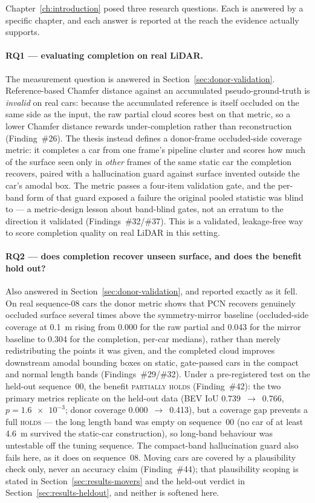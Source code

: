 Chapter~\ref{ch:introduction} posed three research questions. Each is answered by a specific chapter, and each
answer is reported at the reach the evidence actually supports.

\paragraph{RQ1 --- evaluating completion on real LiDAR.}
The measurement question is answered in Section~\ref{sec:donor-validation}. Reference-based Chamfer distance against
an accumulated pseudo-ground-truth is \emph{invalid} on real cars: because the accumulated
reference is itself occluded on the same side as the input, the raw partial cloud scores
best on that metric, so a lower Chamfer distance rewards under-completion rather than
reconstruction (Finding~\#26). The thesis instead defines a donor-frame occluded-side
coverage metric: it completes a car from one frame's pipeline cluster and scores how much
of the surface seen only in \emph{other} frames of the same static car the completion
recovers, paired with a hallucination guard against surface invented outside the car's
amodal box. The metric passes a four-item validation gate, and the per-band form of that
guard exposed a failure the original pooled statistic was blind to --- a metric-design
lesson about band-blind gates, not an erratum to the direction it validated
(Findings~\#32/\#37). This is a validated, leakage-free way to score completion quality on
real LiDAR in this setting.

\paragraph{RQ2 --- does completion recover unseen surface, and does the benefit hold out?}
Also answered in Section~\ref{sec:donor-validation}, and reported exactly as it fell. On real sequence-08 cars the
donor metric shows that PCN recovers genuinely occluded surface several times above the
symmetry-mirror baseline (occluded-side coverage at \SI{0.1}{\metre} rising from
\num{0.000} for the raw partial and \num{0.043} for the mirror baseline to \num{0.304} for
the completion, per-car medians), rather than merely redistributing the points it was
given, and the completed cloud improves downstream amodal bounding boxes on static,
gate-passed cars in the compact and normal length bands (Findings~\#29/\#32). Under a
pre-registered test on the held-out sequence~00, the benefit \textsc{partially holds}
(Finding~\#42): the two primary metrics replicate on the held-out data
(BEV IoU \num{0.739}~$\rightarrow$~\num{0.766}, $p=\num{1.6e-3}$; donor coverage
\num{0.000}~$\rightarrow$~\num{0.413}), but a coverage gap prevents a full \textsc{holds} ---
the long length band was empty on sequence~00 (no car of at least \SI{4.6}{\metre} survived
the static-car construction), so long-band behaviour was untestable off the tuning sequence.
The compact-band hallucination guard also fails here, as it does on sequence~08. Moving cars
are covered by a plausibility check only, never an accuracy claim (Finding~\#44); that
plausibility scoping is stated in Section~\ref{sec:results-movers} and the held-out verdict in Section~\ref{sec:results-heldout}, and
neither is softened here.

